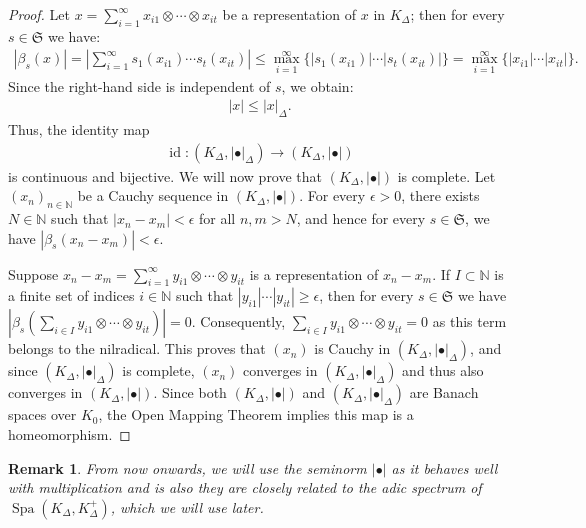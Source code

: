 \documentclass[12pts,a4paper]{amsart}
\newtheorem{remark}[proposition]{Remark}
\DeclareMathOperator{\spa}{Spa}
\DeclareMathOperator{\id}{id}
\begin{document}
\begin{proof}
 Let $x = \sum_{i=1}^\infty x_{i1} \otimes \cdots \otimes x_{it}$ be a representation of $x$ in $K_\Delta$; then for every $s \in \mathfrak{S}$ we have:
\begin{align*}
 |\beta_s(x)| = \left|\sum_{i=1}^\infty s_1(x_{i1}) \cdots s_t(x_{it})\right| \leq \max_{i=1}^\infty \{|s_1(x_{i1})| \cdots |s_t(x_{it})|\} = \max_{i=1}^\infty \{|x_{i1}| \cdots |x_{it}|\}.
\end{align*}
Since the right-hand side is independent of $s$, we obtain:
\begin{align*}
  |x| \leq |x|_\Delta.
\end{align*}
Thus, the identity map
\begin{align*}
\id : (K_\Delta, |\bullet|_\Delta) \to (K_\Delta, |\bullet|)
\end{align*}
is continuous and bijective. We will now prove that $(K_\Delta, |\bullet|)$ is complete. Let $(x_n)_{n\in\mathbb{N}}$ be a Cauchy sequence in $(K_\Delta, |\bullet|)$. For every $\epsilon > 0$, there exists $N \in \mathbb{N}$ such that $|x_n - x_m| < \epsilon$ for all $n, m > N$, and hence for every $s \in \mathfrak{S}$, we have $|\beta_s(x_n - x_m)| < \epsilon$. 

Suppose $x_n - x_m = \sum_{i=1}^\infty y_{i1} \otimes \cdots \otimes y_{it}$ is a representation of $x_n - x_m$. If $I \subset \mathbb{N}$ is a finite set of indices $i \in \mathbb{N}$ such that $|y_{i1}| \cdots |y_{it}| \geq \epsilon$, then for every $s \in \mathfrak{S}$ we have $|\beta_s(\sum_{i \in I} y_{i1} \otimes \cdots \otimes y_{it})| = 0$. Consequently, $\sum_{i \in I} y_{i1} \otimes \cdots \otimes y_{it} = 0$ as this term belongs to the nilradical. This proves that $(x_n)$ is Cauchy in $(K_\Delta, |\bullet|_\Delta)$, and since $(K_\Delta, |\bullet|_\Delta)$ is complete, $(x_n)$ converges in $(K_\Delta, |\bullet|_\Delta)$ and thus also converges in $(K_\Delta, |\bullet|)$. Since both $(K_\Delta, |\bullet|)$ and $(K_\Delta, |\bullet|_\Delta)$ are Banach spaces over $K_0$, the Open Mapping Theorem implies this map is a homeomorphism.
\end{proof}


\begin{remark}
	From now onwards, we will use the seminorm $|\bullet|$ as it behaves well with multiplication and is also they are closely related to the adic spectrum of $\spa(K_\Delta,K^+_\Delta)$, which we will use later.
\end{remark}
\end{document}
